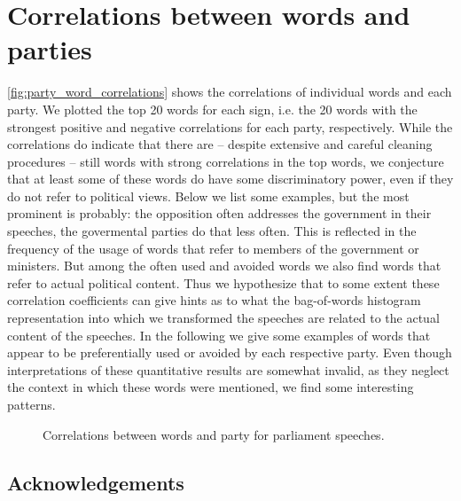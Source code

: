 \documentclass[runningheads,a4paper]{llncs}
\begin{document}
\section{Correlations between words and parties}\label{sec:word_party_correlations}

\autoref{fig:party_word_correlations} shows the correlations of individual words and each party. We plotted the top 20 words for each sign, i.e. the 20 words with the strongest positive and negative correlations for each party, respectively. While the correlations do indicate that there are -- despite extensive and careful cleaning procedures -- still words with strong correlations in the top words, we conjecture that at least some of these words do have some discriminatory power, even if they do not refer to political views. Below we list some examples, but the most prominent is probably: the opposition often addresses the government in their speeches, the govermental parties do that less often. This is reflected in the frequency of the usage of words that refer to members of the government or ministers. But among the often used and avoided words we also find words that refer to actual political content. Thus we hypothesize that to some extent these correlation coefficients can give hints as to what the bag-of-words histogram representation into which we transformed the speeches are related to the actual content of the speeches. In the following we give some examples of words that appear to be preferentially used or avoided by each respective party. Even though interpretations of these quantitative results are somewhat invalid, as they neglect the context in which these words were mentioned, we find some interesting patterns. 

\begin{figure}
\begin{center}
%
\end{center}
\caption{
\label{fig:party_word_correlations}
Correlations between words and party for parliament speeches. }
\end{figure}


\small
\subsection*{Acknowledgements}

%
\small{

 
}
\end{document}
